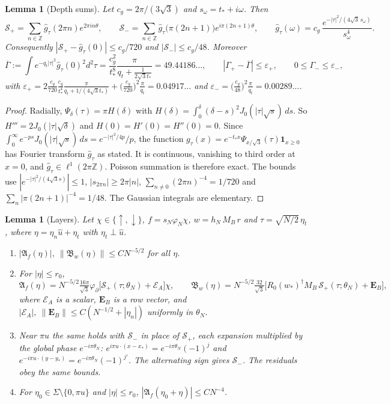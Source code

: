 \documentclass[11pt]{amsart}
\newtheorem{lemma}[theorem]{Lemma}
\theoremstyle{definition}
\theoremstyle{remark}
\newcommand{\Z}{\mathbb{Z}}
\newcommand{\cS}{\mathcal{S}}
\newcommand{\up}{{\uparrow}}
\newcommand{\dn}{{\downarrow}}
\newcommand{\uhat}{\hat u}
\begin{document}
\begin{lemma}[Depth sums]\label{lem:depth}
Let $c_g=2\pi/(3\sqrt3)$ and $s_\omega=t_*+i\omega$.  Then
\[
\cS_+=\sum_{n\in\Z}\hat g_\tau(2\pi n)e^{2\pi in\theta},\qquad
\cS_-=\sum_{n\in\Z}\hat g_\tau\bigl(\pi(2n+1)\bigr)e^{i\pi(2n+1)\theta},\qquad
\hat g_\tau(\omega)=c_g\,\frac{e^{-|\tau|^2/(4\sqrt3\,s_\omega)}}{s_\omega^4}.
\]
Consequently $|\cS_+-\hat g_\tau(0)|\le c_g/720$ and $|\cS_-|\le c_g/48$.
Moreover
\[
\overline\Gamma:=\int e^{-q_t|\tau|^2}\hat g_\tau(0)^2d^2\tau=\frac{c_g^2}{t_*^8}\frac{\pi}{q_t+\frac1{2\sqrt3t_*}}=49.44186\ldots,
\qquad |\Gamma_+-\overline\Gamma|\le\varepsilon_+,\qquad 0\le\Gamma_-\le\varepsilon_-,
\]
with
$\varepsilon_+=2\frac{c_g}{720}\frac{c_g}{t_*^4}\frac{\pi}{q_t+1/(4\sqrt3t_*)}+\bigl(\frac{c_g}{720}\bigr)^2\frac\pi{q_t}=0.04917\ldots$
and $\varepsilon_-=\bigl(\frac{c_g}{48}\bigr)^2\frac\pi{q_t}=0.00289\ldots$.
\end{lemma}

\begin{proof}
Radially, $\Psi_\delta(\tau)=\pi H(\delta)$ with
$H(\delta)=\int_0^\delta(\delta-s)^2J_0(|\tau|\sqrt s)\,ds$.  So $H'''=2J_0(|\tau|\sqrt\delta)$
and $H(0)=H'(0)=H''(0)=0$.  Since
$\int_0^\infty e^{-ps}J_0(|\tau|\sqrt s)\,ds=e^{-|\tau|^2/4p}/p$, the function
$g_\tau(x)=e^{-t_*x}\Psi_{x/\sqrt3}(\tau)\mathbf 1_{x\ge0}$ has Fourier
transform $\hat g_\tau$ as stated.  It is continuous, vanishing to third
order at $x=0$, and $\hat g_\tau\in\ell^1(2\pi\Z)$.  Poisson summation is
therefore exact.  The bounds use $|e^{-|\tau|^2/(4\sqrt3s)}|\le1$,
$|s_{2\pi n}|\ge2\pi|n|$, $\sum_{n\ne0}(2\pi n)^{-4}=1/720$ and
$\sum_n|\pi(2n+1)|^{-4}=1/48$.  The Gaussian integrals are elementary.
\end{proof}

\begin{lemma}[Layers]\label{lem:layers}
Let $\chi\in\{\up,\dn\}$, $f=s_N\varphi_N\chi$, $w=h_N\,M_B\,r$ and
$\tau=\sqrt{N/2}\,\eta_t$, where $\eta=\eta_n\uhat+\eta_t$ with
$\eta_t\perp\uhat$.
\begin{enumerate}[label=(\alph*)]
\item $|\mathfrak A_f(\eta)|,\ \|\mathfrak B_w(\eta)\|\le CN^{-5/2}$ for all $\eta$.
\item For $|\eta|\le r_0$,
  \[
  \mathfrak A_f(\eta)=N^{-5/2}\tfrac{16\pi}{\sqrt3}\varphi_\partial\bigl[\cS_+(\tau;\theta_N)+\mathcal E_A\bigr]\chi,\qquad
  \mathfrak B_w(\eta)=N^{-5/2}\tfrac{32}{\sqrt3}\bigl[R_0(w_*)^\dagger M_B\,\cS_+(\tau;\theta_N)+\mathbf E_B\bigr],
  \]
  where $\mathcal E_A$ is a scalar, $\mathbf E_B$ is a row vector, and
  $|\mathcal E_A|,\ \|\mathbf E_B\|\le C(N^{-1/2}+|\eta_n|)$ uniformly in
  $\theta_N$.
\item Near $\pi u$ the same holds with $\cS_-$ in place of $\cS_+$, each
  expansion multiplied by the global phase $e^{-i\pi\theta_N}$:
  $e^{i\pi u\cdot(x-x_*)}=e^{-i\pi\theta_N}(-1)^j$ and
  $e^{-i\pi u\cdot(y-y_*)}=e^{-i\pi\theta_N}(-1)^{j'}$.  The alternating
  sign gives $\cS_-$.  The residuals obey the same bounds.
\item For $\eta_0\in\Sigma\setminus\{0,\pi u\}$ and $|\eta|\le r_0$,
  $|\mathfrak A_f(\eta_0+\eta)|\le CN^{-4}$.
\end{enumerate}
\end{lemma}
\end{document}
